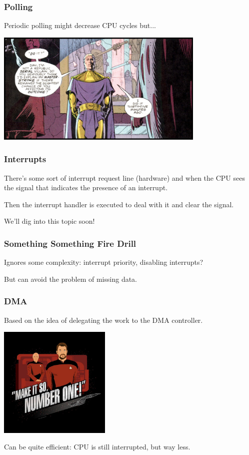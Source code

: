 \begin{frame}
\frametitle{Polling}

Periodic polling might decrease CPU cycles but...

\begin{center}
	\includegraphics[width=0.75\textwidth]{images/watchmen.jpg}
\end{center}


\end{frame}


\begin{frame}
\frametitle{Interrupts}

There's some sort of interrupt request line (hardware) and when the CPU sees the signal that indicates the presence of an interrupt. 

Then the interrupt handler is executed to deal with it and clear the signal.

We'll dig into this topic soon!

\end{frame}


\begin{frame}
\frametitle{Something Something Fire Drill}

Ignores some complexity: interrupt priority, disabling interrupts?

But can avoid the problem of missing data.

\end{frame}


\begin{frame}
\frametitle{DMA}

Based on the idea of delegating the work to the DMA controller.

\begin{center}
	\includegraphics[width=0.4\textwidth]{images/makeitso.jpg}
\end{center}

Can be quite efficient: CPU is still interrupted, but way less.

\end{frame}




